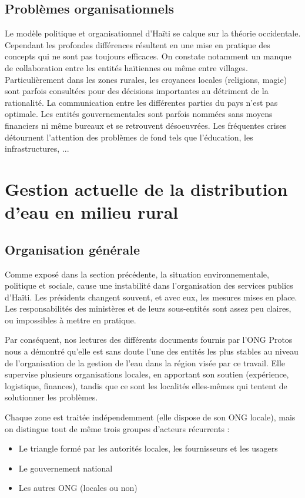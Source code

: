 \documentclass{EPL-master-thesis-covers-FR}
\begin{document}
			\subsection*{Problèmes organisationnels}

				Le modèle politique et organisationnel d'Haïti se calque sur la théorie occidentale. Cependant les profondes différences résultent en une mise en pratique des concepts qui ne sont pas toujours efficaces.
				On constate notamment un manque de collaboration entre les entités haïtiennes ou même entre villages. Particulièrement dans les zones rurales, les croyances locales (religions, magie) sont parfois consultées pour des décisions importantes au détriment de la rationalité. La communication entre les différentes parties du pays n'est pas optimale. Les entités gouvernementales sont parfois nommées sans moyens financiers ni même bureaux et se retrouvent désoeuvrées. Les fréquentes crises détournent l'attention des problèmes de fond tels que l'éducation, les infrastructures, ...

		\section{Gestion actuelle de la distribution d'eau en milieu rural}

			\subsection*{Organisation générale}

				Comme exposé dans la section précédente, la situation environnementale, politique et sociale, cause une instabilité dans l'organisation des services publics d'Haïti. Les présidents changent souvent, et avec eux, les mesures mises en place. Les responsabilités des ministères et de leurs sous-entités sont assez peu claires, ou impossibles à mettre en pratique.

				Par conséquent, nos lectures des différents documents fournis par l'ONG Protos nous a démontré qu'elle est sans doute l'une des entités les plus stables au niveau de l'organisation de la gestion de l'eau dans la région visée par ce travail. Elle supervise plusieurs organisations locales, en apportant son soutien (expérience, logistique, finances), tandis que ce sont les localités elles-mêmes qui tentent de solutionner les problèmes.

				Chaque zone est traitée indépendemment (elle dispose de son ONG locale), mais on distingue tout de même trois groupes d'acteurs récurrents :
				\begin{itemize}
					\item Le triangle formé par les autorités locales, les fournisseurs et les usagers
					\item Le gouvernement national
					\item Les autres ONG (locales ou non)
				\end{itemize}
\end{document}
